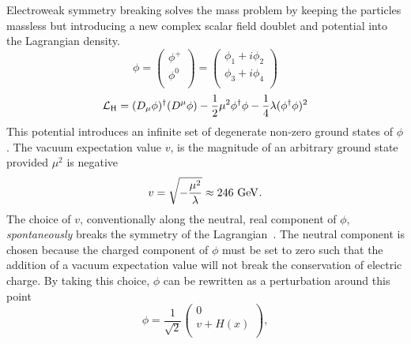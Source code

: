 Electroweak symmetry breaking solves the mass problem by keeping the particles massless but introducing a new complex scalar field doublet and potential into the Lagrangian density.
\begin{equation}
	\phi = 
\begin{pmatrix} 
	\phi^{+} \\
	\phi^{0} \\
\end{pmatrix}
	= 
\begin{pmatrix} 
	\phi_1+i\phi_2 \\
	\phi_3+i\phi_4 \\
\end{pmatrix}
\end{equation}
\begin{equation}
\mathcal{L}_{\mathrm{H}}=(D_{\mu}\phi)^{\dagger}(D^{\mu}\phi)-\frac{1}{2}\mu^{2}\phi^{\dagger}\phi - \frac{1}{4}\lambda(\phi^{\dagger}\phi)^{2}
\end{equation}
This potential introduces an infinite set of degenerate non-zero ground states of $\phi$.
The vacuum expectation value $v$, is the magnitude of an arbitrary ground state provided $\mu^{2}$ is negative
\begin{equation}
	v=\sqrt{-\frac{\mu^2}{\lambda}}\approx246\mathrm{~Ge\hspace{-.08em}V}^{}.
\end{equation} 
The choice of $v$, conventionally along the neutral, real component of $\phi$, \textit{spontaneously} breaks the symmetry of the Lagrangian~\cite{PDG}.
The neutral component is chosen because the charged component of $\phi$ must be set to zero such that the addition of a vacuum expectation value will not break the conservation of electric charge.
By taking this choice, $\phi$ can be rewritten as a perturbation around this point
\begin{equation}
	\phi = \frac{1}{\sqrt{2}}
\begin{pmatrix} 
	0 \\
	v + H(x) \\
\end{pmatrix},
\end{equation}
